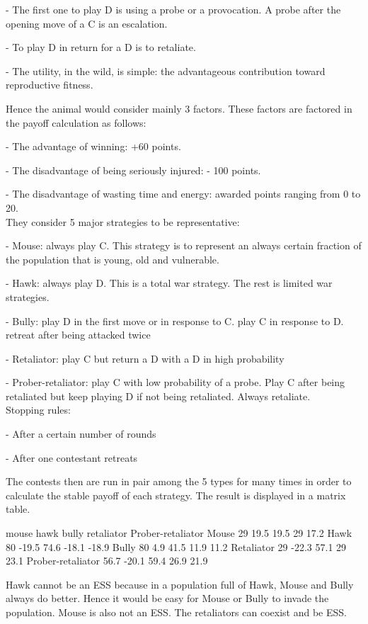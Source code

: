 \documentclass[12.5pt]{report}
\begin{document}
- The first one to play D is using a probe or a provocation. A probe after the opening move of a C is an escalation.

- To play D in return for a D is to retaliate.

- The utility, in the wild, is simple: the advantageous contribution toward reproductive fitness. 

Hence the animal would consider mainly 3 factors. These factors are factored in the payoff calculation as follows:

- The advantage of winning: +60 points.

- The disadvantage of being seriously injured: - 100 points.

- The disadvantage of wasting time and energy: awarded points ranging from 0 to 20.\\

They consider 5 major strategies to be representative:

- Mouse: always play C. This strategy is to represent an always certain fraction of the population that is young, old and vulnerable.

- Hawk:  always play D. This is a total war strategy. The rest is limited war strategies.

- Bully: play D in the first move or in response to C. play C in response to D. retreat after being attacked twice

- Retaliator: play C but return a D with a D in high probability 

- Prober-retaliator: play C with low probability of a probe. Play C after being retaliated but keep playing D if not being retaliated. Always retaliate.\\

Stopping rules:

- After a certain number of rounds

- After one contestant retreats

The contests then are run in pair among the 5 types for many times in order to calculate the stable payoff of each strategy. The result is displayed in a matrix table. 

mouse
hawk
bully
retaliator
Prober-retaliator
Mouse
29
19.5
19.5
29
17.2
Hawk
80
-19.5
74.6
-18.1
-18.9
Bully
80
4.9
41.5
11.9
11.2
Retaliator
29
-22.3
57.1
29
23.1
Prober-retaliator
56.7
-20.1
59.4
26.9
21.9

Hawk cannot be an ESS because in a population full of Hawk, Mouse and Bully always do better. Hence it would be easy for Mouse or Bully to invade the population. Mouse is also not an ESS. The retaliators can coexist and be ESS. \\
\end{document}
